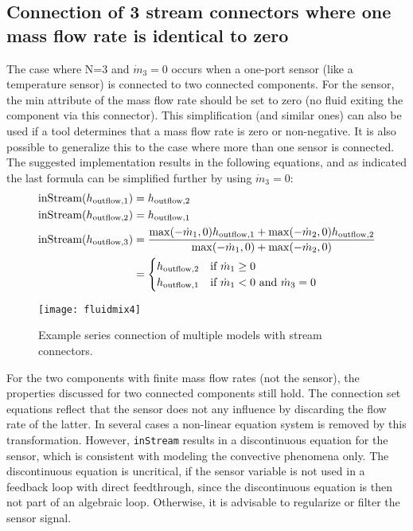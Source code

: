 \subsection{Connection of 3 stream connectors where one mass flow rate is identical to zero}\label{connection-of-3-stream-connectors-where-one-mass-flow-rate-is-identical-to-zero-n-3-and}
The case where N=3 and $\dot{m}_3=0$ occurs when a one-port sensor (like a temperature sensor) is
connected to two connected components. For the sensor, the min attribute
of the mass flow rate should be set to zero (no fluid exiting the
component via this connector).
This simplification (and similar ones) can also be used if a tool determines that a mass flow rate is zero or non-negative.
It is also possible to generalize this to the case where more than one sensor is connected.
The suggested implementation results in
the following equations, and as indicated the last formula can be
simplified further by using $\dot{m}_3=0$:
\begin{align*}
\text{\lstinline!inStream!}(h_{\mathrm{outflow},1}) &= h_{\mathrm{outflow},2}\\
\text{\lstinline!inStream!}(h_{\mathrm{outflow},2}) &= h_{\mathrm{outflow},1}\\
\text{\lstinline!inStream!}(h_{\mathrm{outflow},3}) &= \frac{\operatorname{max}(-\dot{m}_1,0)h_{\mathrm{outflow},1}+\operatorname{max}(-\dot{m}_2,0)h_{\mathrm{outflow},2}}{\operatorname{max}(-\dot{m}_1,0)+\operatorname{max}(-\dot{m}_2,0)}\\
&=
\begin{cases}
h_{\mathrm{outflow},2}&\text{if $\dot{m}_1 \geq 0$}\\
h_{\mathrm{outflow},1}&\text{if $\dot{m}_1 < 0$ and $\dot{m}_3 = 0$}
\end{cases}
\end{align*}
\begin{figure}[H]
  \begin{center}
    \texttt{[image: fluidmix4]}
  \end{center}
  \caption{Example series connection of multiple models with stream connectors.}
\end{figure}

For the two components with finite mass flow rates (not the sensor), the
properties discussed for two connected components still hold. The
connection set equations reflect that the sensor does not any influence
by discarding the flow rate of the latter. In several cases a non-linear
equation system is removed by this transformation. However, \lstinline!inStream!
results in a discontinuous equation for the sensor, which is consistent
with modeling the convective phenomena only. The discontinuous equation
is uncritical, if the sensor variable is not used in a feedback loop
with direct feedthrough, since the discontinuous equation is then not
part of an algebraic loop. Otherwise, it is advisable to regularize or
filter the sensor signal.

